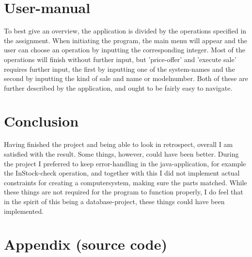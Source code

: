 \documentclass[a4paper,10pt]{article}
\begin{document}

\section{User-manual}

To best give an overview, the application is divided by the operations specified in the assignment. When initiating the program, the main menu will appear and the user can choose an operation by inputting the corresponding integer. Most of the operations will finish without further input, but 'price-offer' and 'execute sale' requires further input, the first by inputting one of the system-names and the second by inputting the kind of sale and name or modelnumber. Both of these are further described by the application, and ought to be fairly easy to navigate. 

\section{Conclusion} 

Having finished the project and being able to look in retrospect, overall I am satisfied with the result. Some things, however, could have been better. During the project I preferred to keep error-handling in the java-application, for example the InStock-check operation, and together with this I did not implement actual constraints for creating a computersystem, making sure the parts matched. While these things are not required for the program to function properly, I do feel that in the spirit of this being a database-project, these things could have been implemented.

\newpage

\section{Appendix (source code)}
\end{document}
